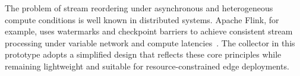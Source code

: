 The problem of stream reordering under asynchronous and heterogeneous compute conditions is well known in distributed systems. Apache Flink, for example, uses watermarks and checkpoint barriers to achieve consistent stream processing under variable network and compute latencies~\cite{carbone_apache_2015}. The collector in this prototype adopts a simplified design that reflects these core principles while remaining lightweight and suitable for resource-constrained edge deployments.